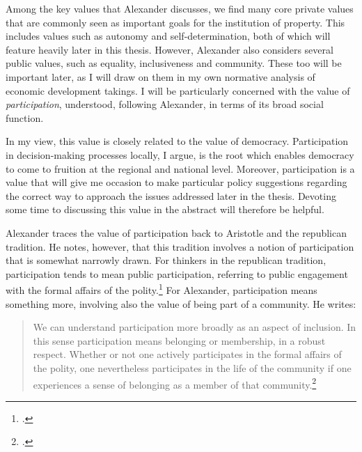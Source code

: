 Among the key values that Alexander discusses, we find many core private values that are commonly seen as important goals for the institution of property. This includes values such as autonomy and self-determination, both of which will feature heavily later in this thesis. However, Alexander also considers several public values, such as equality, inclusiveness and community. These too will be important later, as I will draw on them in my own normative analysis of economic development takings. I will be particularly concerned with the value of {\it participation}, understood, following Alexander, in terms of its broad social function.

In my view, this value is closely related to the value of democracy. Participation in decision-making processes locally, I argue, is the root which enables democracy to come to fruition at the regional and national level. Moreover, participation is a value that will give me occasion to make particular policy suggestions regarding the correct way to approach the issues addressed later in the thesis. Devoting some time to discussing this value in the abstract will therefore be helpful.

Alexander traces the value of participation back to Aristotle and the republican tradition. He notes, however, that this tradition involves a notion of participation that is somewhat narrowly drawn. For thinkers in the republican tradition, participation tends to mean public participation, referring to public engagement with the formal affairs of the polity.\footcite[1275]{alexander14} For Alexander, participation means something more, involving also the value of being part of a community. He writes:

\begin{quote}
We can understand participation more broadly as an aspect of inclusion. In this sense participation means belonging or membership, in a robust respect. Whether or not one actively participates in the formal affairs of the polity, one nevertheless participates in the life of the community if one experiences a sense of belonging as a member of that community.\footcite[1275]{alexander14}
\end{quote}

